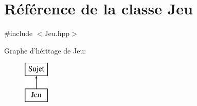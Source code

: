 \hypertarget{class_jeu}{\section{Référence de la classe Jeu}
\label{class_jeu}
}


{\ttfamily \#include $<$Jeu.\-hpp$>$}

Graphe d'héritage de Jeu\-:\begin{figure}[H]
\begin{center}
\leavevmode
\includegraphics[height=2.000000cm]{class_jeu}
\end{center}
\end{figure}
